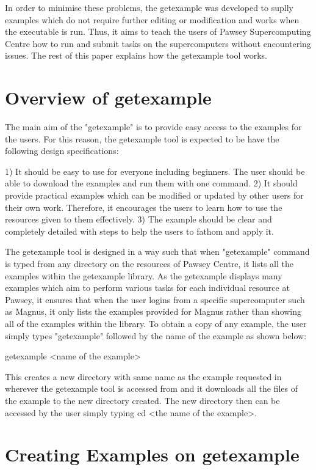 \documentclass[journal]{IEEEtran}
\begin{document}
In order to minimise these problems, the getexample was developed to suplly examples which do not require further editing or modification and works
when the executable is run. Thus, it aims to teach the users of Pawsey Supercomputing Centre how to run and submit tasks on the supercomputers without 
encountering issues. The rest of this paper explains how the getexample tool works.   

\section{Overview of getexample}

The main aim of the "getexample" is to provide easy access to the examples for the users. For this reason, the getexample tool is expected to be have the 
following design specifications:

1) It should be easy to use for everyone including beginners. The user should be able to download the examples and run them with one command.
2) It should provide practical examples which can be modified or updated by other users for their own work. Therefore, it encourages the users to learn
how to use the resources given to them effectively.
3) The example should be clear and completely detailed with steps to help the users to fathom and apply it.

The getexample tool is designed in a way such that when "getexample" command is typed from any directory on the resources of Pawsey Centre, it lists all 
the examples within the getexample library. As the getexample displays many examples which aim to perform various tasks for each individual resource at
Pawsey, it ensures that when the user logins from a specific supercomputer such as Magnus, it only lists the examples provided for Magnus rather than
showing all of the examples within the library. To obtain a copy of any example, the user simply types "getexample" followed by the name of the example 
as shown below:

getexample <name of the example>

This creates a new directory with same name as the example requested in wherever the getexample tool is accessed from and it downloads all the files of
the example to the new directory created. The new directory then can be accessed by the user simply typing cd <the name of the example>. 
 
\section{Creating Examples on getexample}
\end{document}
